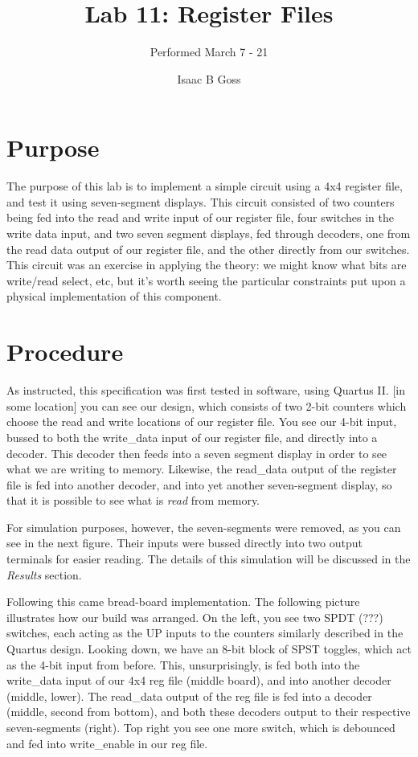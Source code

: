 \documentclass[titlepage]{article}
\author{Isaac B Goss}
\title{Lab 11: Register Files}
\subtitle{Performed March 7 - 21}
\begin{document}
    \maketitle
    \section{Purpose}
        The purpose of this lab is to implement a simple circuit using a 4x4 register file, and test it using seven-segment displays.
        This circuit consisted of two counters being fed into the read and write input of our register file, four switches in the write data input, and two seven segment displays, fed through decoders, one from the read data output of our register file, and the other directly from our switches.
        This circuit was an exercise in applying the theory: we might know what bits are write/read select, etc, but it's worth seeing the particular constraints put upon a physical implementation of this component.
        
    \section{Procedure}
        As instructed, this specification was first tested in software, using Quartus II.
        [in some location] you can see our design, which consists of two 2-bit counters which choose the read and write locations of our register file.
        You see our 4-bit input, bussed to both the write_data input of our register file, and directly into a decoder.
        This decoder then feeds into a seven segment display in order to see what we are writing to memory.
        Likewise, the read_data output of the register file is fed into another decoder, and into yet another seven-segment display, so that it is possible to see what is \textit{read} from memory.
        
        For simulation purposes, however, the seven-segments were removed, as you can see in the next figure.  Their inputs were bussed directly into two output terminals for easier reading. 
        The details of this simulation will be discussed in the \textit{Results} section.
        
        Following this came bread-board implementation.  The following picture illustrates how our build was arranged.
        On the left, you see two SPDT (???) switches, each acting as the UP inputs to the counters similarly described in the Quartus design.
        Looking down, we have an 8-bit block of SPST toggles, which act as the 4-bit input from before.
        This, unsurprisingly, is fed both into the write_data input of our 4x4 reg file (middle board), and into another decoder (middle, lower).
        The read_data output of the reg file is fed into a decoder (middle, second from bottom), and both these decoders output to their respective seven-segments (right).
        Top right you see one more switch, which is debounced and fed into write_enable in our reg file.
        
\end{document}
